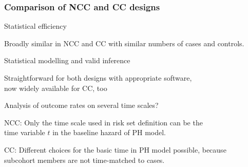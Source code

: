 \documentclass[12pt,dvipsnames,t,handout%
,aspectratio=169%
]{beamer}
\begin{document}
\begin{comment}
\begin{frame}
  \frametitle{Heuristic derivation of the variance penalty}

\bi
\item
  If we start with a larger cohort of size $N_C$, 
  the penalty for deleting a random member is smaller
  \[
  \frac{N_{SC}}{N_C} \mbox{cov}(\Delta\widehat\beta)
  \]
  where $N_{SC}$ is the size of the sub-cohort.
\medskip
\item  
  Apply this penalty for each subject excluded from the subcohort
  \[
  (N_C - N_{SC}) \frac{N_{SC}}{N_C} \mbox{cov}(\Delta\widehat\beta)
  \]
\item  
  This can also be written
  \[
  ( 1 - \alpha) \sum_{i \in SC} \Delta\widehat\beta_i \Delta\widehat\beta_i^T
  \]
  where $\alpha = N_{SC}/N_C$ is the sampling fraction.
  \ei
  
\end{frame}

\end{comment}

\begin{frame}
\frametitle{Comparison of NCC and CC designs}

\pause
\bi
\item Statistical efficiency
\bi
\item[ ] Broadly similar in NCC
and CC with similar numbers of cases and controls.
\ei
\pause
\item Statistical modelling and valid inference \pause
\bi
\item[ ] Straightforward for both designs with appropriate software, \\ 
now  widely available for CC, too 
 \ei
 \pause
 \item Analysis of outcome rates on several time scales?
 \pause
 \bi
 \item[NCC:] Only the time scale used in risk set definition
 can be the \\ time variable $t$ in the baseline hazard 
 of PH model.\pause\medskip
 \item[CC:] Different choices for the basic time  in
    PH model possible, because \\ subcohort members are
    not time-matched to cases. 
 \ei
 \ei
 \end{frame}
 
\end{document}
